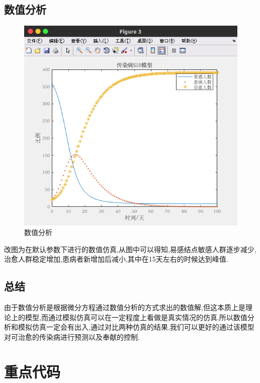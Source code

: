 \documentclass[supercite]{HustGraduPaper}
\begin{document}
	\subsection{数值分析}
	\begin{figure}[H]
		\centering
		\includegraphics[scale=0.5]{Figures/shuzhi.png}
		\caption{数值分析}
	\end{figure} 
	改图为在默认参数下进行的数值仿真,从图中可以得知,易感结点敏感人群逐步减少,治愈人群稳定增加,患病者新增加后减小,其中在15天左右的时候达到峰值. \par

	\subsection{总结}
	由于数值分析是根据微分方程通过数值分析的方式求出的数值解,但这本质上是理论上的模型,而通过模拟仿真可以在一定程度上看做是真实情况的仿真,所以数值分析和模拟仿真一定会有出入,通过对比两种仿真的结果,我们可以更好的通过该模型对可治愈的传染病进行预测以及奉献的控制.

	\section{重点代码}
\end{document}
